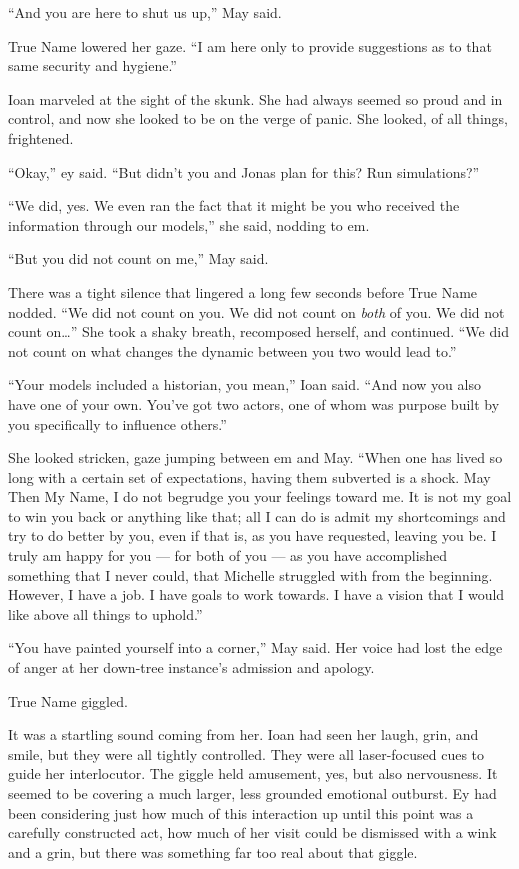 ``And you are here to shut us up,'' May said.

True Name lowered her gaze. ``I am here only to provide suggestions as to that same security and hygiene.''

Ioan marveled at the sight of the skunk. She had always seemed so proud and in control, and now she looked to be on the verge of panic. She looked, of all things, frightened.

``Okay,'' ey said. ``But didn't you and Jonas plan for this? Run simulations?''

``We did, yes. We even ran the fact that it might be you who received the information through our models,'' she said, nodding to em.

``But you did not count on me,'' May said.

There was a tight silence that lingered a long few seconds before True Name nodded. ``We did not count on you. We did not count on \emph{both} of you. We did not count on\ldots{}'' She took a shaky breath, recomposed herself, and continued. ``We did not count on what changes the dynamic between you two would lead to.''

``Your models included a historian, you mean,'' Ioan said. ``And now you also have one of your own. You've got two actors, one of whom was purpose built by you specifically to influence others.''

She looked stricken, gaze jumping between em and May. ``When one has lived so long with a certain set of expectations, having them subverted is a shock. May Then My Name, I do not begrudge you your feelings toward me. It is not my goal to win you back or anything like that; all I can do is admit my shortcomings and try to do better by you, even if that is, as you have requested, leaving you be. I truly am happy for you — for both of you — as you have accomplished something that I never could, that Michelle struggled with from the beginning. However, I have a job. I have goals to work towards. I have a vision that I would like above all things to uphold.''

``You have painted yourself into a corner,'' May said. Her voice had lost the edge of anger at her down-tree instance's admission and apology.

True Name giggled.

It was a startling sound coming from her. Ioan had seen her laugh, grin, and smile, but they were all tightly controlled. They were all laser-focused cues to guide her interlocutor. The giggle held amusement, yes, but also nervousness. It seemed to be covering a much larger, less grounded emotional outburst. Ey had been considering just how much of this interaction up until this point was a carefully constructed act, how much of her visit could be dismissed with a wink and a grin, but there was something far too real about that giggle.

